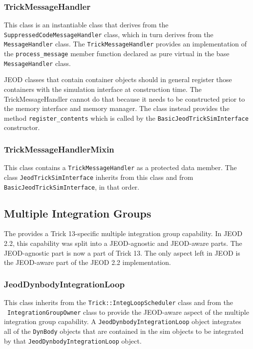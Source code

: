 \subsubsection{TrickMessageHandler}
This class is an instantiable class that derives from the
\verb|SuppressedCodeMessageHandler| class, which in turn derives from
the \verb|MessageHandler| class.
The \verb|TrickMessageHandler| provides an implementation of the
\verb|process_message| member function declared as pure virtual in the base
\verb|MessageHandler| class.

JEOD classes that contain container objects should in general register those
containers with the simulation interface at construction time.
The TrickMessageHandler cannot do that because it needs to be constructed
prior to the memory interface and memory manager.
The class instead provides the method \verb|register_contents| which is
called by the \verb|BasicJeodTrickSimInterface| constructor.

\subsubsection{TrickMessageHandlerMixin}
This class contains a \verb|TrickMessageHandler| as a protected data member.
The class \verb|JeodTrickSimInterface| inherits from this class and from
\verb|BasicJeodTrickSimInterface|, in that order.


\subsection{Multiple Integration Groups}
The \ModelDesc provides a Trick 13-specific multiple integration group
capability. In JEOD 2.2, this capability was split into a JEOD-agnostic and
JEOD-aware parts. The JEOD-agnostic part is now a part of Trick 13. The
only aspect left in JEOD is the JEOD-aware part of the JEOD 2.2 implementation.

\subsubsection{JeodDynbodyIntegrationLoop}
This class inherits from the \verb|Trick::IntegLoopScheduler| class
and from the \INTEGRATION\ \verb|IntegrationGroupOwner| class to
 provide the JEOD-aware aspect of the multiple integration group
capability.
A \verb|JeodDynbodyIntegrationLoop| object integrates all of the
\verb|DynBody| objects that are contained in the sim objects to be integrated
by that \verb|JeodDynbodyIntegrationLoop| object.

